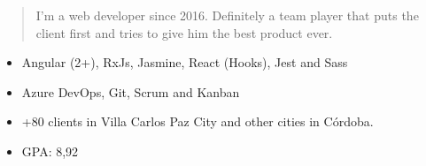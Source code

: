 \documentclass[10pt,a4paper,ragged2e,withhyper]{altacv}
\begin{document}
\begin{paracol}{2}
        
        
        \newpage
        
        \switchcolumn
        
            \begin{quote}
                I'm a web developer since 2016. Definitely a team player that puts the client first and tries to give him the best product ever.
            \end{quote}
        
            \begin{itemize}
                \item Angular (2+), RxJs, Jasmine, React (Hooks), Jest and Sass
                \item Azure DevOps, Git, Scrum and Kanban
            \end{itemize}
            \divider
            
            \begin{itemize}
                \item +80 clients in Villa Carlos Paz City and other cities in Córdoba.
            \end{itemize}
        
            \begin{itemize}
                \item GPA: 8,92
            \end{itemize}
            \divider
            

\end{paracol}
\end{document}
